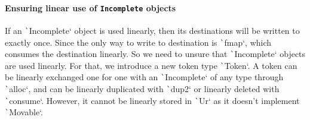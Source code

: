 \documentclass[english]{jflart}
\begin{document}




\paragraph{Ensuring linear use of \texttt{Incomplete} objects}

If an \texttt`Incomplete` object is used linearly, then its destinations will be written to exactly once. Since the only way to write to destination is \texttt`fmap`, which consumes the destination linearly. So we need to unsure that \texttt`Incomplete` objects are used linearly. For that, we introduce a new token type \texttt`Token`. A token can be linearly exchanged one for one with an \texttt`Incomplete` of any type through \texttt`alloc`, and can be linearly duplicated with \texttt`dup2` or linearly deleted with \texttt`consume`. However, it cannot be linearly stored in \texttt`Ur` as it doesn't implement \texttt`Movable`.
\end{document}
